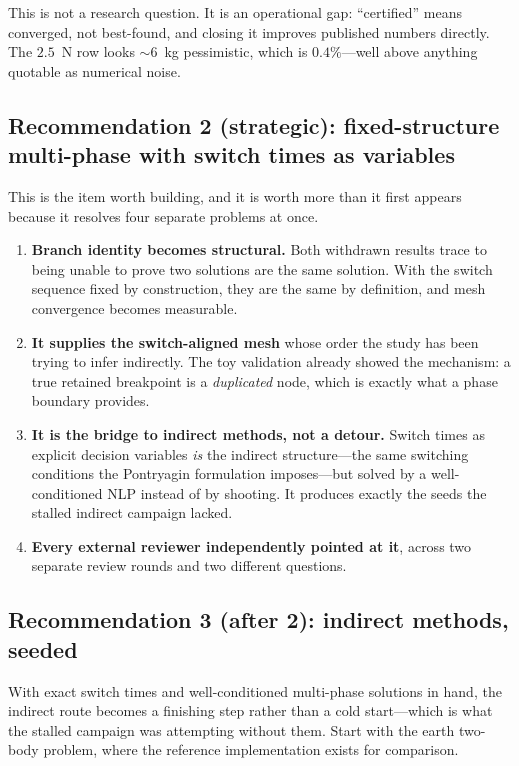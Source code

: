 \documentclass[11pt]{article}
\begin{document}
This is not a research question. It is an operational gap: ``certified'' means
converged, not best-found, and closing it improves published numbers directly.
The $2.5$~N row looks $\sim\!6$~kg pessimistic, which is $0.4\%$---well above
anything quotable as numerical noise.

\subsection{Recommendation 2 (strategic): fixed-structure multi-phase with
switch times as variables}

This is the item worth building, and it is worth more than it first appears
because it resolves four separate problems at once.

\begin{enumerate}
  \item \textbf{Branch identity becomes structural.} Both withdrawn results
  trace to being unable to prove two solutions are the same solution. With the
  switch sequence fixed by construction, they are the same by definition, and
  mesh convergence becomes measurable.
  \item \textbf{It supplies the switch-aligned mesh} whose order the study has
  been trying to infer indirectly. The toy validation already showed the
  mechanism: a true retained breakpoint is a \emph{duplicated} node, which is
  exactly what a phase boundary provides.
  \item \textbf{It is the bridge to indirect methods, not a detour.} Switch
  times as explicit decision variables \emph{is} the indirect structure---the
  same switching conditions the Pontryagin formulation imposes---but solved by
  a well-conditioned NLP instead of by shooting. It produces exactly the seeds
  the stalled indirect campaign lacked.
  \item \textbf{Every external reviewer independently pointed at it}, across
  two separate review rounds and two different questions.
\end{enumerate}

\subsection{Recommendation 3 (after 2): indirect methods, seeded}

With exact switch times and well-conditioned multi-phase solutions in hand, the
indirect route becomes a finishing step rather than a cold start---which is
what the stalled campaign was attempting without them. Start with the earth
two-body problem, where the reference implementation exists for comparison.
\end{document}
